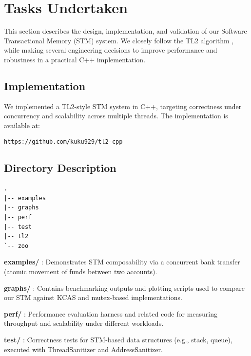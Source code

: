 \documentclass[11pt,a4paper]{article}
\begin{document}

\section{Tasks Undertaken}

This section describes the design, implementation, and validation of our Software Transactional Memory (STM) system. We closely follow the TL2 algorithm \cite{tl2}, while making several engineering decisions to improve performance and robustness in a practical C++ implementation.

\subsection{Implementation}

We implemented a TL2-style STM system in C++, targeting correctness under concurrency and scalability across multiple threads. The implementation is available at:

\begin{verbatim}
https://github.com/kuku929/tl2-cpp
\end{verbatim}

\subsection{Directory Description}

\begin{verbatim}
.
|-- examples
|-- graphs
|-- perf
|-- test
|-- tl2
`-- zoo
\end{verbatim}

\textbf{examples/} : Demonstrates STM composability via a concurrent bank transfer (atomic movement of funds between two accounts).

\textbf{graphs/} : Contains benchmarking outputs and plotting scripts used to compare our STM against KCAS and mutex-based implementations.

\textbf{perf/} : Performance evaluation harness and related code for measuring throughput and scalability under different workloads.

\textbf{test/} : Correctness tests for STM-based data structures (e.g., stack, queue), executed with ThreadSanitizer and AddressSanitizer.
\end{document}
